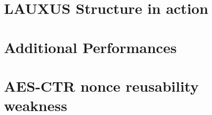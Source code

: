 \documentclass[../main.tex]{subfiles}
\begin{document}
\section{LAUXUS Structure in action}
    \label{appendix:lauxus_structure}
    
\section{Additional Performances}
    \label{appendix:additional_perf}
    
    
\section{AES-CTR nonce reusability weakness}
    \label{appendix:ctr_nonce_weakness}
    
\end{document}
